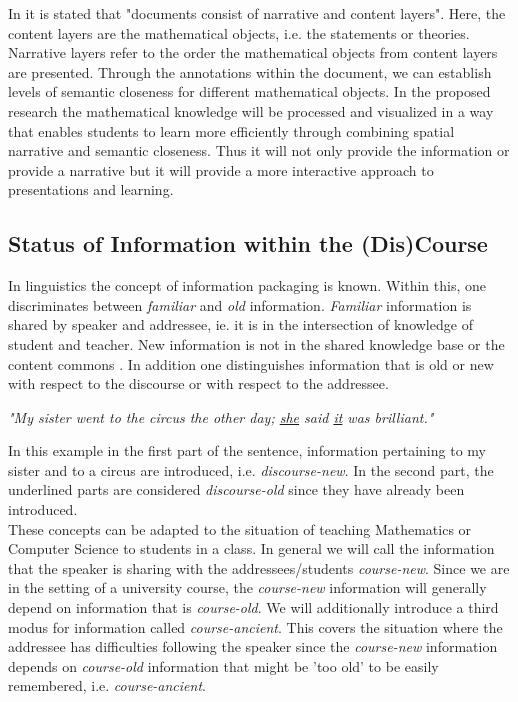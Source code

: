 \documentclass[twoside]{article}
\begin{document}
In \cite{LK:MathOntoAuthDoc09} it is stated that "documents consist of narrative and content layers". Here, the content layers are the mathematical objects, i.e. the statements or theories. Narrative layers refer to the order the mathematical objects from content layers are presented. Through the annotations within the document, we can establish levels of semantic closeness for different mathematical objects. In the proposed research the mathematical knowledge will be processed and visualized in a way that enables students to learn more efficiently through combining spatial narrative and semantic closeness. Thus it will not only provide the information or provide a narrative but it will provide a more interactive approach to presentations and learning.\\

\subsection{Status of Information within the (Dis)Course}
In linguistics the concept of information packaging \cite{CambridgeGrammar:npentrel14} is known. Within this, one discriminates between \textit{familiar} and \textit{old} information. \textit{Familiar} information is shared by speaker and addressee, ie. it is in the intersection of knowledge of student and teacher. New information is not in the shared knowledge base or the content commons \cite{CNX:whitepaper}. In addition one distinguishes information that is old or new with respect to the discourse or with respect to the addressee.

\begin{center}
\textit{"My sister went to the circus the other day; \underline{she} said \underline{it} was brilliant."}\\
\end{center}

In this example in the first part of the sentence, information pertaining to my sister and to a circus are introduced, i.e. \textit{discourse-new}. In the second part, the underlined parts are considered \textit{discourse-old} since they have already been introduced.\\

These concepts can be adapted to the situation of teaching Mathematics or Computer Science to students in a class. In general we will call the information that the speaker is sharing with the addressees/students \textit{course-new}. Since we are in the setting of a university course, the \textit{course-new} information will generally depend on information that is \textit{course-old}. We will additionally introduce a third modus for information called \textit{course-ancient}. This covers the situation where the addressee has difficulties following the speaker since the \textit{course-new} information depends on \textit{course-old} information that might be 'too old' to be easily remembered, i.e. \textit{course-ancient}.\\
\end{document}
